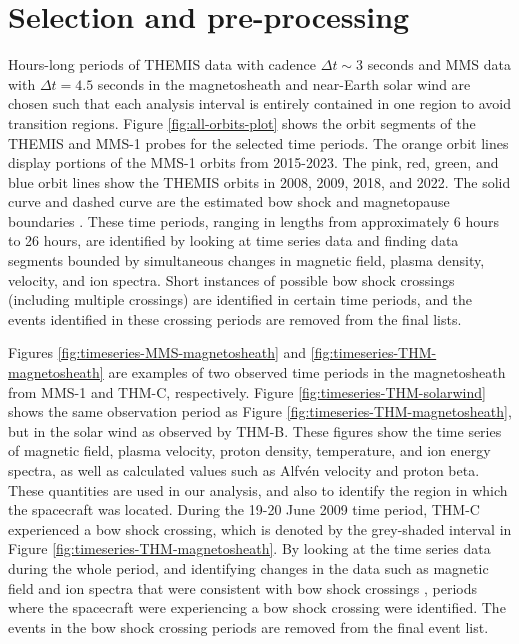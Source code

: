 \section{Selection and pre-processing}
Hours-long periods of THEMIS data with cadence $\Delta t\sim$3 seconds and MMS data with $\Delta t=4.5$ seconds in the magnetosheath and near-Earth solar wind are chosen such that each analysis interval is entirely contained in one region to avoid transition regions. Figure \ref{fig:all-orbits-plot} shows the orbit segments of the THEMIS and MMS-1 probes for the selected time periods. The orange orbit lines display portions of the MMS-1 orbits from 2015-2023. The pink, red, green, and blue orbit lines show the THEMIS orbits in 2008, 2009, 2018, and 2022. The solid curve and dashed curve are the estimated bow shock and magnetopause boundaries \citep{SlavinHolzer:1984,Shue:1997}. These time periods, ranging in lengths from approximately 6 hours to 26 hours, are identified by looking at time series data and finding data segments bounded by simultaneous changes in magnetic field, plasma density, velocity, and ion spectra. Short instances of possible bow shock crossings (including multiple crossings) are identified in certain time periods, and the events identified in these crossing periods are removed from the final lists.

Figures \ref{fig:timeseries-MMS-magnetosheath} and \ref{fig:timeseries-THM-magnetosheath} are examples of two observed time periods in the magnetosheath from MMS-1 and THM-C, respectively. Figure \ref{fig:timeseries-THM-solarwind} shows the same observation period as Figure \ref{fig:timeseries-THM-magnetosheath}, but in the solar wind as observed by THM-B. These figures show the time series of magnetic field, plasma velocity, proton density, temperature, and ion energy spectra, as well as calculated values such as Alfv\'en velocity and proton beta. These quantities are used in our analysis, and also to identify the region in which the spacecraft was located. During the 19-20 June 2009 time period, THM-C experienced a bow shock crossing, which is denoted by the grey-shaded interval in Figure \ref{fig:timeseries-THM-magnetosheath}. By looking at the time series data during the whole period, and identifying changes in the data such as magnetic field and ion spectra that were consistent with bow shock crossings \citep{Lalti:2022,Trotta:2022}, periods where the spacecraft were experiencing a bow shock crossing were identified. The events in the bow shock crossing periods are removed from the final event list.


